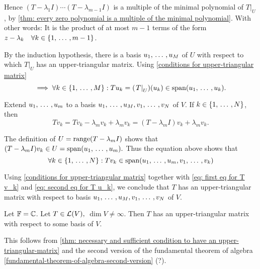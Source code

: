 \begin{prf}
  Hence $(T-\lambda_1 I) \cdots (T-\lambda_{m-1}I)$ is a multiple of the minimal polynomial of $\left. T \right |_{U}$, by \ref{thm: every zero polynomial is a multiple of the minimal polynomial}. With other words: It is the product of at most $m-1$ terms of the form $z-\lambda_k \quad \forall k \in \{1, {\, \ldots \,\,}, m-1 \}$.

  By the induction hypothesis, there is a basis $u_1, {\, \ldots \,\,}, u_M$ of $U$ with respect to which $\left. T \right |_{U}$ has an upper-triangular matrix. Using \ref{conditions for upper-triangular matrix}
  \begin{equation}
    \label{eq: first eq for T v_k}
    \implies \forall k \in \{ 1, {\, \ldots \,\,}, M \}:
    T u_k = ( \left. T \right|_{U})(u_k)
    \in \operatorname{span} (u_1, {\, \ldots \,\,}, u_k).
  \end{equation}

  Extend $u_1, {\, \ldots \,\,}, u_m$ to a basis $u_1, {\, \ldots \,\,}, u_M, v_1, {\, \ldots \,\,}, v_N$ of $V$. If $k \in \{1, {\, \ldots \,\,}, N\}$, then
  \begin{equation}
    T v_k = T v_k - \lambda_m v_k + \lambda_m v_k = (T-\lambda_m I)v_k + \lambda_m v_k.
  \end{equation}

  The definition of $U=\operatorname{range}(T-\lambda_mI)$ shows that $(T-\lambda_mI) v_k \in U = \operatorname{span} (u_1, {\, \ldots \,\,}, u_m).$ Thus the equation above shows that
  \begin{equation}
    \label{eq: second eq for T u_k}
    \forall k \in \{ 1, {\, \ldots \,\,}, N \}: T v_k \in \operatorname{span} (u_1, {\, \ldots \,\,}, u_m, v_1, {\, \ldots \,\,}, v_k)
  \end{equation}

  Using \ref{conditions for upper-triangular matrix} together with \eqref{eq: first eq for T v_k} and \eqref{eq: second eq for T u_k}, we conclude that $T$ has an upper-triangular matrix with respect to basis $u_1, {\, \ldots \,\,}, u_M, v_1, {\, \ldots \,\,}, v_N$ of $V$.
\end{prf}


\setcounter{thm}{46}
\begin{thm}
  \label{thm: sufficienct condition about the field for every operator on V to have an upper-triangular matrix}
  Let $\mathbb{F} = \mathbb{C}$. Let $T\in \mathcal{L} (V),$ $\dim V \neq \infty$. Then $T$ has an upper-triangular matrix with respect to some basis of $V$.
\end{thm}
\begin{prf}
  This follows from \ref{thm: necessary and sufficient condition to have an upper-triangular-matrix} and the second version of the fundamental theorem of algebra \ref{fundamental-theorem-of-algebra-second-version} (?).
\end{prf}